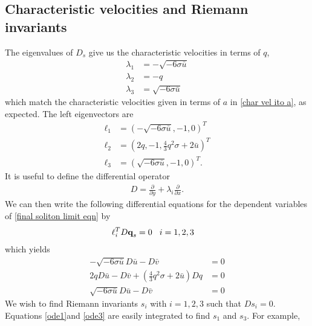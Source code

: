 \documentclass[12pt]{article}
\newcommand{\pd}[0]{\partial}
\numberwithin{equation}{section}
\begin{document}
\subsection{Characteristic velocities and Riemann invariants} \label{sec:sol char velocities and riemann inv}

The eigenvalues of $D_s$ give us the characteristic velocities in terms of $q$,
\begin{subequations}
    \begin{align}
        \lambda_1 &= -\sqrt{-6\sigma \bar u} \\
        \lambda_2 &= -q \\
        \lambda_3 &= \sqrt{-6\sigma \bar u}
        \end{align} \label{char vel ito q}
\end{subequations}
which match the characteristic velocities given in terms of $a$ in \eqref{char vel ito a}, as expected. The left eigenvectors are
\begin{subequations}
\begin{align}
    \ell_1 &= \left(-\sqrt{-6\sigma \bar u}, -1, 0 \right)^T \\
    \ell_2 &= \left(2q, -1, \frac{4}{3}q^2\sigma + 2\bar u\right)^T\\
    \ell_3 &= \left(\sqrt{-6\sigma \bar u}, -1, 0 \right)^T.
\end{align} \label{left eigvecs ito q}
\end{subequations}
It is useful to define the differential operator \begin{align}
    D = \frac{\pd }{\pd y} + \lambda_i \frac{\pd }{\pd x} \label{D}.
\end{align}
We can then write the following differential equations for the dependent variables of \eqref{final soliton limit eqn} by 
\begin{align*}
    \ell_i^T D\textbf{q}_s &= 0 \hspace{3mm} i = 1,2,3
\end{align*}
which yields
\begin{subequations}
\begin{align}
    -\sqrt{-6\sigma \bar u}D\bar u - D\bar v &= 0 \label{ode1}\\
    2q D\bar u - D\bar v + \left(\frac{4}{3}q^2\sigma + 2\bar u\right)D q &=0\label{ode2}\\
    \sqrt{-6\sigma \bar u}D\bar u - D\bar v &= 0 \label{ode3}
\end{align}
\end{subequations}
We wish to find Riemann invariants $s_i$ with $i = 1,2,3$ such that $Ds_i = 0$. Equations \eqref{ode1}and \eqref{ode3} are easily integrated to find $s_1$ and $s_3$. For example,
\end{document}
